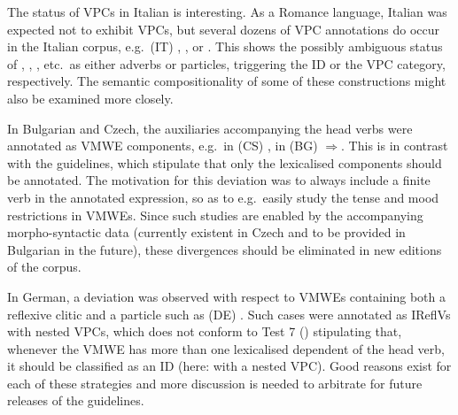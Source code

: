 \documentclass[output=paper,modfonts]{langscibook}
\begin{document}


The status of VPCs in Italian is interesting. As a Romance language, Italian was expected not to exhibit VPCs, but several dozens of VPC annotations do occur in the Italian corpus, e.g.\ (IT) , %
, 
or . This shows the possibly ambiguous status of , , , etc.\ as either adverbs or particles, triggering the ID or the VPC category, respectively. The semantic compositionality of some of these constructions might also be examined more closely.

In Bulgarian and Czech, the auxiliaries accompanying the head verbs were annotated as VMWE components, e.g.\ in (CS) , in (BG) %
 $\Rightarrow$. This is in contrast with the guidelines, which stipulate that only the lexicalised components should be annotated. %
The motivation for this deviation was to always include a finite verb in the annotated expression, so as to e.g.\ easily study the tense and mood restrictions in VMWEs. Since such studies are enabled by the accompanying morpho-syntactic data (currently existent in Czech and to be provided in Bulgarian in the future), these divergences should be eliminated in new editions of the corpus. 

In German, a deviation was observed with respect to VMWEs containing both a reflexive clitic and a particle such as  (DE) . Such cases were annotated as IReflVs with nested VPCs, which does not conform to Test 7 () stipulating that, whenever the VMWE has more than one lexicalised dependent of the head verb, it should be classified as an ID (here: with a nested VPC).  Good reasons exist for each of these strategies and more discussion is needed to arbitrate for future releases of the guidelines.
\end{document}

